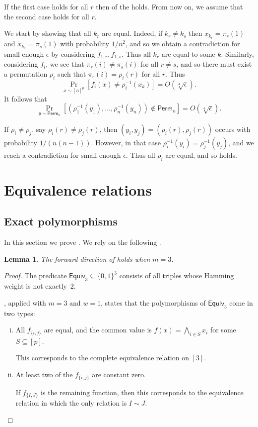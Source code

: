 \documentclass{article}
\providecommand{\Perm}{\mathsf{Perm}}
\providecommand{\Equiv}{\mathsf{Equiv}}
\newtheorem{lemma}[theorem]{Lemma}
\theoremstyle{definition}
\theoremstyle{remark}
\begin{document}
If the first case holds for all $r$ then  of the  holds. From now on, we assume that the second case holds for all $r$.

We start by showing that all $k_r$ are equal. Indeed, if $k_r \neq k_s$ then $x_{k_r} = \pi_r(1)$ and $x_{k_s} = \pi_s(1)$ with probability $1/n^2$, and so we obtain a contradiction for small enough $\epsilon$ by considering $f_{1,r},f_{1,s}$. Thus all $k_r$ are equal to some $k$. Similarly, considering $f_i$, we see that $\pi_r(i) \neq \pi_s(i)$ for all $r \neq s$, and so there must exist a permutation $\rho_i$ such that $\pi_r(i) = \rho_i(r)$ for all $r$. Thus
\[
 \Pr_{x \sim [n]^p}[f_i(x) \neq \rho_i^{-1}(x_k)] = O(\sqrt[4]{\epsilon}).
\]
It follows that
\[
 \Pr_{y \sim \Perm_n}[(\rho_1^{-1}(y_1),\dots,\rho_n^{-1}(y_n)) \notin \Perm_n] = O(\sqrt[4]{\epsilon}).
\]

If $\rho_i \neq \rho_j$, say $\rho_i(r) \neq \rho_j(r)$, then $(y_i,y_j) = (\rho_i(r), \rho_j(r))$ occurs with probability $1/(n(n-1))$. However, in that case $\rho_i^{-1}(y_i) = \rho_j^{-1}(y_j)$, and we reach a contradiction for small enough $\epsilon$.
Thus all $\rho_i$ are equal, and so  holds.

\section{Equivalence relations}
\label{sec:equivalence}

\subsection{Exact polymorphisms}
\label{sec:equivalence-exact}

In this section we prove . We rely on the following .

\begin{lemma}
\label{lem:equiv3-polymorphisms}
The forward direction of  holds when $m = 3$.
\end{lemma}
\begin{proof}
The predicate $\Equiv_3 \subseteq \{0,1\}^3$ consists of all triples whose Hamming weight is not exactly~$2$.

\cite[Theorem 1.6(5)]{Filmus26}, applied with $m = 3$ and $w = 1$, states that the polymorphisms of $\Equiv_3$ come in two types:
\begin{enumerate}[(i)]
\item All $f_{\{i,j\}}$ are equal, and the common value is $f(x) = \bigwedge_{i \in S} x_i$ for some $S \subseteq [p]$.

This corresponds to the complete equivalence relation on $[3]$.
\item At least two of the $f_{\{i,j\}}$ are constant zero.

If $f_{\{I,J\}}$ is the remaining function, then this corresponds to the equivalence relation in which the only relation is $I \sim J$. \qedhere
\end{enumerate}
\end{proof}
\end{document}
